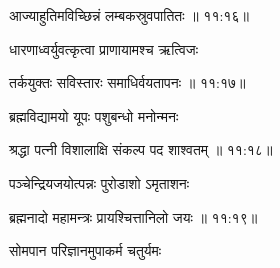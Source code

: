 
{\devanagarifont आज्याहुतिमविच्छिन्नं लम्बकस्रुवपातितः {॥ ११:१६॥} \veg\dontdisplaylinenum }%

{\devanagarifont धारणाध्वर्युवत्कृत्वा प्राणायामश्च ऋत्विजः \thinspace{\dandab} \dontdisplaylinenum }%


{\devanagarifont तर्कयुक्तः सविस्तारः समाधिर्वयतापनः {॥ ११:१७॥} \veg\dontdisplaylinenum }%

{\devanagarifont ब्रह्मविद्यामयो यूपः पशुबन्धो मनोन्मनः \thinspace{\dandab} \dontdisplaylinenum }%


{\devanagarifont श्रद्धा पत्नी विशालाक्षि संकल्प पद शाश्वतम् {॥ ११:१८॥} \veg\dontdisplaylinenum }%

{\devanagarifont पञ्चेन्द्रियजयोत्पन्नः पुरोडाशो ऽमृताशनः \thinspace{\dandab} \dontdisplaylinenum }%


{\devanagarifont ब्रह्मनादो महामन्त्रः प्रायश्चित्तानिलो जयः {॥ ११:१९॥} \veg\dontdisplaylinenum }%

{\devanagarifont सोमपान परिज्ञानमुपाकर्म चतुर्यमः \thinspace{\dandab} \dontdisplaylinenum }%

